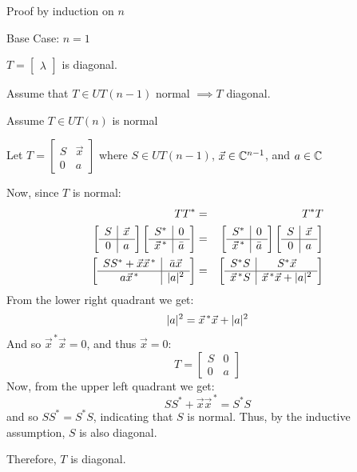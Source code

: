 \documentclass[letterpaper,12pt,fleqn]{article}
\newcommand{\vx}{\vec{x}}
\newcommand{\vxct}{\vx^{\,*}}
\renewcommand{\l}{\lambda}
\begin{document}
\begin{theproof}
  Proof by induction on $n$

  \begin{description}
  \item Base Case: $n=1$

    $T=\begin{bmatrix}\l\end{bmatrix}$ is diagonal.

  \item Assume that $T\in UT(n-1)$ normal $\implies T$ diagonal.

  \item Assume $T\in UT(n)$ is normal

    Let $T=\left[\begin{array}{c|c}
        S & \vx \\
        \hline
        0 & a
      \end{array}\right]$ where $S\in UT(n-1)$, $\vx\in\C^{n-1}$, and $a\in\mathbb{C}$

    Now, since $T$ is normal:
    \begin{eqnarray*}
      TT^* &=& T^*T \\
      \left[\begin{array}{c|c} S & \vx \\ \hline 0 & a \end{array}\right]
      \left[\begin{array}{c|c} S^* & 0 \\ \hline \vxct & \bar{a} \end{array}
        \right]
      &=&
      \left[\begin{array}{c|c} S^* & 0 \\ \hline \vxct & \bar{a} \end{array}
        \right]
      \left[\begin{array}{c|c} S & \vx \\ \hline 0 & a \end{array}\right] \\
      \left[\begin{array}{c|c} SS^*+\vx\vxct & \bar{a}\vx \\ \hline
          a\vxct & \abs{a}^2 \end{array}\right] &=&
      \left[\begin{array}{c|c} S^*S & S^*\vx \\ \hline
        \vxct S & \vxct\vx+\abs{a}^2 \end{array}\right]
    \end{eqnarray*}
    From the lower right quadrant we get:
    \[\abs{a}^2=\vxct\vx+\abs{a}^2\]
    And so $\vxct\vx=0$, and thus $\vx=0$:
    \[T=\left[\begin{array}{c|c} S & 0 \\ \hline 0 & a \end{array}\right]\]
    Now, from the upper left quadrant we get:
    \[SS^*+\vx\vxct=S^*S\]
    and so $SS^*=S^*S$, indicating that $S$ is normal. Thus, by the inductive
    assumption, $S$ is also diagonal.

    Therefore, $T$ is diagonal.
  \end{description}
\end{theproof}
\end{document}
